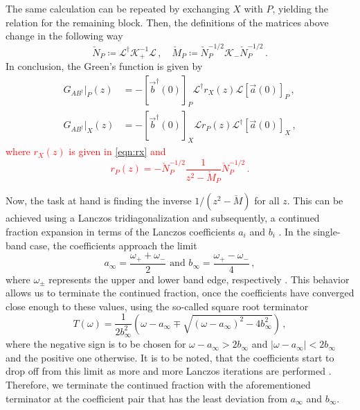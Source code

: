 \documentclass[
    reprint, 
    aps,
    preprintnumbers,
    twocolumn,
    prb,
    superscriptaddress
]{revtex4-2}
\begin{document}
The same calculation can be repeated by exchanging $X$ with $P$, yielding the relation for the remaining block.
Then, the definitions of the matrices above change in the following way
\begin{equation}
    \check{N}_P \coloneqq \mathcal{L}^\dagger \mathcal{K}_+^{-1} \mathcal{L}\,,\quad \check{M}_P \coloneqq \check{N}_P^{-1/2} \mathcal{K}_- \check{N}_P^{-1/2}\,.
\end{equation}
In conclusion, the Green's function is given by
\begin{subequations}
    \begin{align}
        G_{AB^\dagger} \vert_P (z) &= - \left[ \vec{b}^\dagger (0) \right]_P \mathcal{L}^\dagger r_X (z) \mathcal{L} \left[ \vec{a}(0) \right]_P\,, \\
        G_{AB^\dagger} \vert_X (z) &= - \left[ \vec{b}^\dagger (0) \right]_X \mathcal{L} r_P (z) \mathcal{L}^\dagger \left[ \vec{a}(0) \right]_X\,,
    \end{align}
\end{subequations}
\textcolor{red}{where $r_X (z)$ is given in \eqref{eqn:rx} and 
\begin{equation}
    r_P (z) = -\check{N}_P^{-1/2} \frac{1}{z^2 - \check{M}_P} \check{N}_P^{-1/2}\,.
\end{equation}}

Now, the task at hand is finding the inverse $1/(z^2 - \check{M})$ for all $z$.
This can be achieved using a Lanczos tridiagonalization and subsequently, a continued fraction expansion in terms of the Lanczos coefficients $a_i$ and $b_i$ \cite{PettiforRecursion,ViswanathRecursion}.
In the single-band case, the coefficients approach the limit
\begin{equation}
    \label{eqn:inf_lanczos}
    a_\infty = \frac{\omega_+ + \omega_-}{2}\text{  and  } b_\infty = \frac{\omega_+ - \omega_-}{4}\,,
\end{equation}
where $\omega_\pm$ represents the upper and lower band edge, respectively \cite{PettiforRecursion}.
This behavior allows us to terminate the continued fraction, once the coefficients have converged close enough to these values, using the so-called square root terminator
\begin{equation}
    T(\omega) = \frac{1}{2b_\infty^2} \left( \omega - a_\infty \mp \sqrt{(\omega - a_\infty)^2 - 4 b_\infty^2} \right)\,,
\end{equation}
where the negative sign is to be chosen for $\omega - a_\infty > 2b_\infty$ and $|\omega - a_\infty| < 2b_\infty$ and the positive one otherwise.
It is to be noted, that the coefficients start to drop off from this limit as more and more Lanczos iterations are performed \cite{ViswanathRecursion}.
Therefore, we terminate the continued fraction with the aforementioned terminator at the coefficient pair that has the least deviation from $a_\infty$ and $b_\infty$.
\end{document}
